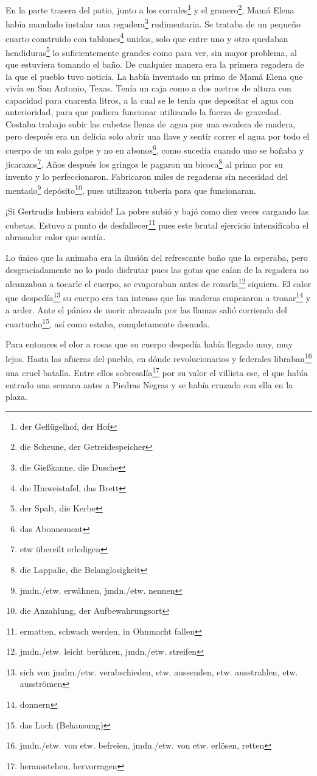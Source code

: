 En la parte trasera del patio, junto a los corrales\footnote{der Geflügelhof, der Hof}
y el granero\footnote{die Scheune, der Getreidespeicher}, Mamá
Elena había mandado instalar una regadera\footnote{die Gießkanne, die Dusche}
rudimentaria. Se trataba de un pequeño cuarto construido con tablones\footnote{die Hinweistafel, das Brett}
unidos, solo que entre uno y otro quedaban hendiduras\footnote{der Spalt, die Kerbe}
lo suficientemente grandes como para ver, sin mayor problema, al que
estuviera tomando el baño. De cualquier manera era la
primera regadera de la que el pueblo tuvo noticia. La había inventado un
primo de Mamá Elena que vivía en San Antonio, Texas. Tenía un caja como
a dos metros de altura con capacidad para cuarenta litros, a la cual se le
tenía que depositar el agua con anterioridad, para que pudiera funcionar
utilizando la fuerza de gravedad. Costaba trabajo subir las cubetas
llenas de~agua por una escalera de madera, pero después era un
delicia solo abrir una llave y sentir correr el agua por todo el cuerpo
de un solo golpe y no en abonos\footnote{das Abonnement}, como sucedía
cuando uno se bañaba y jicarazos\footnote{etw übereilt erledigen}.
Años después los gringos le pagaron un bicoca\footnote{die Lappalie, die Belanglosigkeit}
al primo por su invento y lo perfeccionaron. Fabricaron miles de regaderas sin necesidad
del mentado\footnote{jmdn./etw. erwähnen, jmdn./etw. nennen} depósito\footnote{die Anzahlung, der Aufbewahrungsort},
pues utilizaron tubería para que funcionaran.

¡Si Gertrudis hubiera sabido! La pobre subió y bajó como diez veces
cargando las cubetas. Estuvo a punto de desfallecer\footnote{ermatten, schwach werden, in Ohnmacht fallen}
pues este brutal ejercicio intensificaba el abrasador calor que sentía.

Lo único que la animaba era la ilusión del refrescante baño que la
esperaba, pero desgraciadamente no lo pudo disfrutar pues las gotas que
caían de la regadera no alcanzaban a tocarle el cuerpo, se evaporaban
antes de rozarla\footnote{jmdn./etw. leicht berühren, jmdn./etw. streifen}
siquiera. El calor que despedía\footnote{sich von jmdm./etw. verabschieden, etw. aussenden, etw. ausstrahlen, etw. ausströmen}
su cuerpo era tan intenso que las maderas empezaron a tronar\footnote{donnern}
y a arder. Ante el pánico de morir abrasada por las llamas salió corriendo
del cuartucho\footnote{das Loch (Behausung)},
así como estaba, completamente desnuda.

Para entonces el olor a rosas que su cuerpo despedía había llegado muy,
muy lejos. Hasta las afueras del pueblo, en dónde revolucionarios y
federales libraban\footnote{jmdn./etw. von etw. befreien, jmdn./etw. von etw. erlösen, retten}
una cruel batalla. Entre ellos sobresalía\footnote{herausstehen, hervorragen}
por su valor el villista ese, el que había entrado una semana
antes a Piedras Negras y se había cruzado con ella en la plaza.

